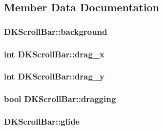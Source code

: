 \subsection{Member Data Documentation}
\hypertarget{class_d_k_scroll_bar_ad5f8342dde236d31ae18b721e369fea9}{
\subsubsection[{background}]{ D\-K\-Scroll\-Bar\-::background}}\label{class_d_k_scroll_bar_ad5f8342dde236d31ae18b721e369fea9}
\hypertarget{class_d_k_scroll_bar_abe218ec338a58d1d31abcd9d8e72dce4}{
\subsubsection[{drag\-\_\-x}]{\setlength{\rightskip}{0pt plus 5cm}int D\-K\-Scroll\-Bar\-::drag\-\_\-x}}\label{class_d_k_scroll_bar_abe218ec338a58d1d31abcd9d8e72dce4}
\hypertarget{class_d_k_scroll_bar_aea84ee1a7493f98e142cb0ddfd9997fe}{
\subsubsection[{drag\-\_\-y}]{\setlength{\rightskip}{0pt plus 5cm}int D\-K\-Scroll\-Bar\-::drag\-\_\-y}}\label{class_d_k_scroll_bar_aea84ee1a7493f98e142cb0ddfd9997fe}
\hypertarget{class_d_k_scroll_bar_ada9b3fa01c8f5abee812d2735171f7a2}{
\subsubsection[{dragging}]{\setlength{\rightskip}{0pt plus 5cm}bool D\-K\-Scroll\-Bar\-::dragging}}\label{class_d_k_scroll_bar_ada9b3fa01c8f5abee812d2735171f7a2}
\hypertarget{class_d_k_scroll_bar_aac22c304468601bddf50ccaae6d3d07a}{
\subsubsection[{glide}]{ D\-K\-Scroll\-Bar\-::glide}}\label{class_d_k_scroll_bar_aac22c304468601bddf50ccaae6d3d07a}
